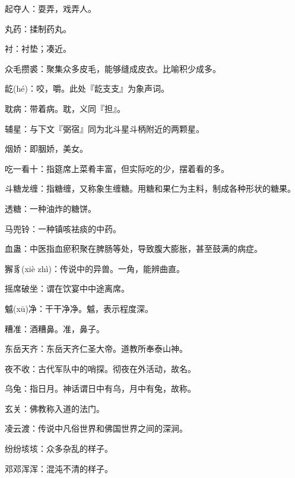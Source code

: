 \startbuffer[1953]
起夺人：耍弄，戏弄人。
\stopbuffer


\startbuffer[1954]
丸药：揉制药丸。
\stopbuffer


\startbuffer[1955]
衬：衬垫；凑近。
\stopbuffer


\startbuffer[1956]
众毛攒裘：聚集众多皮毛，能够缝成皮衣。比喻积少成多。
\stopbuffer


\startbuffer[1957]
龁(hé)：咬，嚼。此处『龁支支』为象声词。
\stopbuffer


\startbuffer[1958]
耽病：带着病。耽，义同『担』。
\stopbuffer


\startbuffer[1959]
辅星：与下文『弼宿』同为北斗星斗柄附近的两颗星。
\stopbuffer


\startbuffer[1960]
烟娇：即胭娇，美女。
\stopbuffer


\startbuffer[1961]
吃一看十：指筵席上菜肴丰富，但实际吃的少，摆着看的多。
\stopbuffer


\startbuffer[1962]
斗糖龙缠：指糖缠，又称象生缠糖。用糖和果仁为主料，制成各种形状的糖果。
\stopbuffer


\startbuffer[1963]
透糖：一种油炸的糖饼。
\stopbuffer


\startbuffer[1964]
马兜铃：一种镇咳袪痰的中药。
\stopbuffer


\startbuffer[1965]
血蛊：中医指血瘀积聚在脾肠等处，导致腹大膨胀，甚至鼓满的病症。
\stopbuffer


\startbuffer[1966]
獬豸(xiè zhì)：传说中的异兽。一角，能辨曲直。
\stopbuffer


\startbuffer[1967]
摇席破坐：谓在饮宴中中途离席。
\stopbuffer


\startbuffer[1968]
魆(xū)净：干干净净。魆，表示程度深。
\stopbuffer


\startbuffer[1969]
糟准：酒糟鼻。准，鼻子。
\stopbuffer


\startbuffer[1970]
东岳天齐：东岳天齐仁圣大帝。道教所奉泰山神。
\stopbuffer


\startbuffer[1971]
夜不收：古代军队中的哨探。彻夜在外活动，故名。
\stopbuffer


\startbuffer[1972]
乌兔：指日月。神话谓日中有乌，月中有兔，故称。
\stopbuffer


\startbuffer[1973]
玄关：佛教称入道的法门。
\stopbuffer


\startbuffer[1974]
凌云渡：传说中凡俗世界和佛国世界之间的深涧。
\stopbuffer


\startbuffer[1975]
纷纷垓垓：众多杂乱的样子。
\stopbuffer


\startbuffer[1976]
邓邓浑浑：混沌不清的样子。
\stopbuffer


